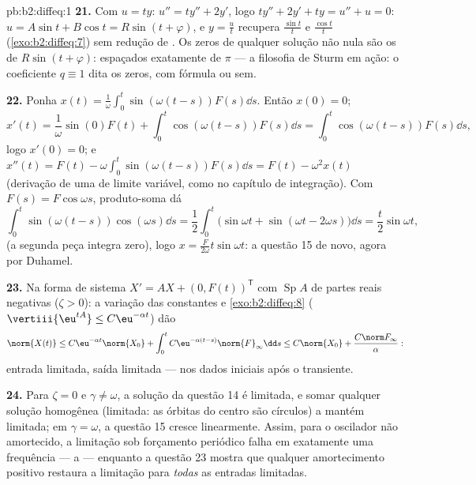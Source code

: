 \begin{solution}{pb:b2:diffeq:1}
\textbf{21.} Com $u = ty$: $u'' = ty'' + 2y'$, logo $ty'' + 2y'
+ ty = u'' + u = 0$: $u = A\sin t + B\cos t = R\sin(t +
\varphi)$, e $y = \frac{u}{t}$ recupera $\frac{\sin t}t$ e
$\frac{\cos t}t$ (\cref{exo:b2:diffeq:7}) sem redução de
. Os zeros de qualquer solução não nula são os de
$R\sin(t + \varphi)$: espaçados exatamente de $\pi$ --- a
filosofia de Sturm em ação: o coeficiente $q \equiv 1$ dita
os zeros, com fórmula ou sem.

\textbf{22.} Ponha $x(t) =
\frac1\omega\int_0^t\sin(\omega(t-s))F(s)\dd s$. Então $x(0) =
0$;
\[
x'(t) = \frac1\omega\sin(0)F(t) +
\int_0^t\cos(\omega(t-s))F(s)\dd s
= \int_0^t\cos(\omega(t-s))F(s)\dd s ,
\]
logo $x'(0) = 0$; e $x''(t) = F(t) -
\omega\int_0^t\sin(\omega(t-s))F(s)\dd s = F(t) - \omega^2x(t)$
(derivação de uma  de limite variável,
como no capítulo de integração). Com $F(s) = F\cos\omega s$,
produto-soma dá
\[
\int_0^t\sin(\omega(t-s))\cos(\omega s)\dd s
= \frac12\int_0^t\bigl(\sin\omega t + \sin(\omega t -
2\omega s)\bigr)\dd s
= \frac{t}{2}\sin\omega t ,
\]
(a segunda peça integra zero), logo $x =
\frac{F}{2\omega}t\sin\omega t$: a questão 15 de novo, agora por
Duhamel.

\textbf{23.} Na forma de sistema $X' = AX + (0, F(t))^{\mathsf T}$
com $\operatorname{Sp}A$ de partes reais negativas ($\zeta >
0$): a variação das constantes e \cref{exo:b2:diffeq:8}
($\vertiii{\eu^{tA}} \leq C\eu^{-\alpha t}$) dão
\[
\norm{X(t)} \leq C\eu^{-\alpha t}\norm{X_0}
+ \int_0^t C\eu^{-\alpha(t-s)}\norm{F}_\infty\dd s
\leq C\norm{X_0} + \frac{C\norm F_\infty}{\alpha} :
\]
entrada limitada, saída limitada ---  nos dados
iniciais após o transiente.

\textbf{24.} Para $\zeta = 0$ e $\gamma \neq \omega$,
a solução da questão 14 é limitada, e somar qualquer solução
homogênea (limitada: as órbitas do centro são círculos) a mantém
limitada; em $\gamma = \omega$, a questão 15 cresce linearmente. Assim,
para o oscilador não amortecido, a limitação sob forçamento
periódico falha em exatamente uma frequência --- a  ---
enquanto a questão 23 mostra que qualquer amortecimento positivo restaura
a limitação para \emph{todas} as entradas limitadas.


\end{solution}
